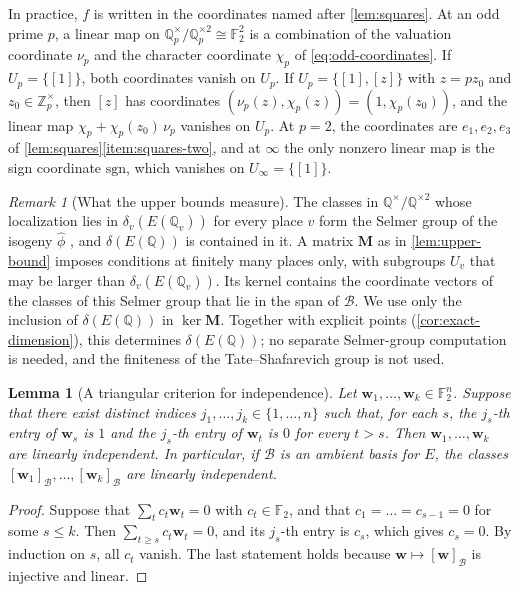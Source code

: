 \documentclass[12pt,oneside,openany]{book}
\theoremstyle{definition}
\theoremstyle{plain}
\numberwithin{equation}{chapter}
\theoremstyle{plain}
\newtheorem{lemma}[lemma]{Lemma}
\theoremstyle{definition}
\theoremstyle{remark}
\newtheorem{remark}[remark]{Remark}
\newcommand{\Q}{\mathbb Q}
\newcommand{\Z}{\mathbb Z}
\newcommand{\F}{\mathbb F}
\newcommand{\sq}[1]{[#1]}
\newcommand{\sqgp}[1]{#1^{\times}/#1^{\times2}}
\newcommand{\dual}{\hat\phi}
\newcommand{\cB}{\mathcal B}
\begin{document}
In practice, $f$ is written in the coordinates named after \cref{lem:squares}. At an odd prime $p$, a linear map on $\sqgp{\Q_p}\cong\F_2^2$ is a combination of the valuation coordinate $\nu_p$ and the character coordinate $\chi_p$ of \eqref{eq:odd-coordinates}. If $U_p=\{\sq1\}$, both coordinates vanish on $U_p$. If $U_p=\{\sq1,\sq z\}$ with $z=pz_0$ and $z_0\in\Z_p^\times$, then $\sq z$ has coordinates $(\nu_p(z),\chi_p(z))=(1,\chi_p(z_0))$, and the linear map $\chi_p+\chi_p(z_0)\,\nu_p$ vanishes on $U_p$. At $p=2$, the coordinates are $e_1,e_2,e_3$ of \cref{lem:squares}\ref{item:squares-two}, and at $\infty$ the only nonzero linear map is the sign coordinate $\mathrm{sgn}$, which vanishes on $U_\infty=\{\sq1\}$.

\begin{remark}[What the upper bounds measure]\label{rem:selmer}
The classes in $\sqgp\Q$ whose localization lies in $\delta_v(E(\Q_v))$ for every place $v$ form the Selmer group of the isogeny $\dual$ \cite[Section~X.4]{SilvermanAEC}, and $\delta(E(\Q))$ is contained in it. A matrix $\mathbf M$ as in \cref{lem:upper-bound} imposes conditions at finitely many places only, with subgroups $U_v$ that may be larger than $\delta_v(E(\Q_v))$. Its kernel contains the coordinate vectors of the classes of this Selmer group that lie in the span of $\cB$. We use only the inclusion of $\delta(E(\Q))$ in $\ker\mathbf M$. Together with explicit points (\cref{cor:exact-dimension}), this determines $\delta(E(\Q))$; no separate Selmer-group computation is needed, and the finiteness of the Tate--Shafarevich group is not used.
\end{remark}

\begin{lemma}[A triangular criterion for independence]\label{lem:independence}
Let $\mathbf w_1,\dots,\mathbf w_k\in\F_2^n$. Suppose that there exist distinct indices $j_1,\dots,j_k\in\{1,\dots,n\}$ such that, for each $s$, the $j_s$-th entry of $\mathbf w_s$ is $1$ and the $j_s$-th entry of $\mathbf w_t$ is $0$ for every $t>s$. Then $\mathbf w_1,\dots,\mathbf w_k$ are linearly independent. In particular, if $\cB$ is an ambient basis for $E$, the classes $\sq{\mathbf w_1}_{\cB},\dots,\sq{\mathbf w_k}_{\cB}$ are linearly independent.
\end{lemma}

\begin{proof}
Suppose that $\sum_tc_t\mathbf w_t=0$ with $c_t\in\F_2$, and that $c_1=\dots=c_{s-1}=0$ for some $s\le k$. Then $\sum_{t\ge s}c_t\mathbf w_t=0$, and its $j_s$-th entry is $c_s$, which gives $c_s=0$. By induction on $s$, all $c_t$ vanish. The last statement holds because $\mathbf w\mapsto\sq{\mathbf w}_{\cB}$ is injective and linear.
\end{proof}
\end{document}
